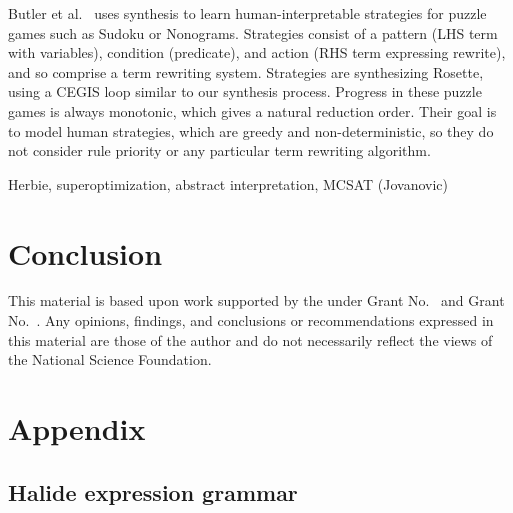 \documentclass[sigplan,10pt,review,anonymous]{acmart}\settopmatter{printfolios=true,printccs=false,printacmref=false}
\begin{document}
Butler et al.~\cite{butler2017synthesizing} uses synthesis to learn human-interpretable strategies for puzzle games such as Sudoku or Nonograms. Strategies consist of a pattern (LHS term with variables), condition (predicate), and action (RHS term expressing rewrite), and so comprise a term rewriting system. Strategies are synthesizing Rosette, using a CEGIS loop similar to our synthesis process. Progress in these puzzle games is always monotonic, which gives a natural reduction order. Their goal is to model human strategies, which are greedy and non-deterministic, so they do not consider rule priority or any particular term rewriting algorithm. 

Herbie, superoptimization, abstract interpretation, MCSAT (Jovanovic)

\section{Conclusion}


\begin{acks}                            %
  This material is based upon work supported by the
   under Grant
  No.~ and Grant
  No.~.  Any opinions, findings, and
  conclusions or recommendations expressed in this material are those
  of the author and do not necessarily reflect the views of the
  National Science Foundation.
\end{acks}





\appendix
\section{Appendix}

\subsection{Halide expression grammar}
\label{ss:appendixA}
\end{document}
